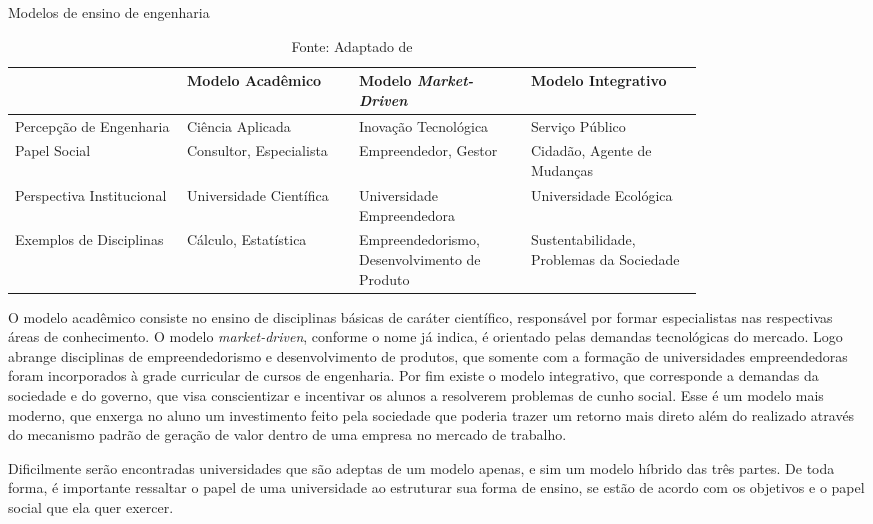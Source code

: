\begin{table}[H]
\begin{center}
\caption{Modelos de ensino de engenharia}
\label{tab:modelos_ensino_tab}
{\def\arraystretch{2}\tabcolsep=10pt
\begin{tabular}{>{\raggedright}p{0.2\linewidth}>{\raggedright\arraybackslash}p{0.2\linewidth}>{\raggedright\arraybackslash}p{0.2\linewidth}>{\raggedright\arraybackslash}p{0.2\linewidth}}
\hline
     & Modelo Acadêmico & Modelo \textit{Market-Driven} & Modelo Integrativo \\ \hline
     Percepção de Engenharia & Ciência Aplicada & Inovação Tecnológica & Serviço Público \\
     Papel Social & Consultor, Especialista & Empreendedor, Gestor & Cidadão, Agente de Mudanças \\
     Perspectiva Institucional & Universidade Científica & Universidade Empreendedora & Universidade Ecológica  \\
	 Exemplos de Disciplinas & Cálculo, Estatística & Empreendedorismo, Desenvolvimento de Produto & Sustentabilidade, Problemas da Sociedade \\ \hline
\end{tabular}%
}
\caption* {Fonte: Adaptado de }
\end{center}
\end{table}

O modelo acadêmico consiste no ensino de disciplinas básicas de caráter científico, responsável por formar especialistas nas respectivas áreas de conhecimento. O modelo \textit{market-driven}, conforme o nome já indica, é orientado pelas demandas tecnológicas do mercado. Logo abrange disciplinas de empreendedorismo e desenvolvimento de produtos, que somente com a formação de universidades empreendedoras foram incorporados à grade curricular de cursos de engenharia. Por fim existe o modelo integrativo, que corresponde a demandas da sociedade e do governo, que visa conscientizar e incentivar os alunos a resolverem problemas de cunho social. Esse é um modelo mais moderno, que enxerga no aluno um investimento feito pela sociedade que poderia trazer um retorno mais direto além do realizado através do mecanismo padrão de geração de valor dentro de uma empresa no mercado de trabalho. 

Dificilmente serão encontradas universidades que são adeptas de um modelo apenas, e sim um modelo híbrido das três partes. De toda forma, é importante ressaltar o papel de uma universidade ao estruturar sua forma de ensino, se estão de acordo com os objetivos e o papel social que ela quer exercer.

